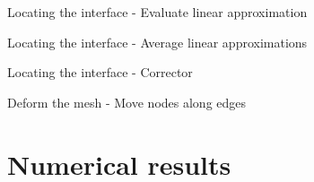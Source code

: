 \documentclass{beamer}  %
\begin{document}
\begin{frame}{Locating the interface - Evaluate linear approximation}
    \begin{figure}
        \centering
        \only<2>{}%
    \end{figure}
\end{frame}

\begin{frame}{Locating the interface - Average linear approximations}
    \begin{figure}
        \centering
        
    \end{figure}
\end{frame}

\begin{frame}{Locating the interface - Corrector}
    \begin{figure}
        \centering
        
    \end{figure}
\end{frame}

\begin{frame}{Deform the mesh - Move nodes along edges}
    \begin{figure}
        \centering
        
    \end{figure}
\end{frame}




\section{Numerical results}
\end{document}
